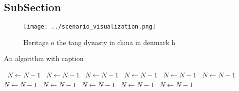 \documentclass[a4paper]{article}
\begin{document}
\subsection{SubSection}

\begin{figure}
\centering
\texttt{[image: ../scenario\_visualization.png]}
\caption{Heritage o the tang dynasty in china in denmark h
}
\end{figure}
 
\begin{algorithm}
\caption{An algorithm with caption}
\begin{algorithmic}
\    \State $N \gets N - 1$
\    \State $N \gets N - 1$
\    \State $N \gets N - 1$
\    \State $N \gets N - 1$
\    \State $N \gets N - 1$
\    \State $N \gets N - 1$
\    \State $N \gets N - 1$
\    \State $N \gets N - 1$
\    \State $N \gets N - 1$
\    \State $N \gets N - 1$
\    \State $N \gets N - 1$
\EndWhile
\end{algorithmic}
\end{algorithm}
\end{document}
